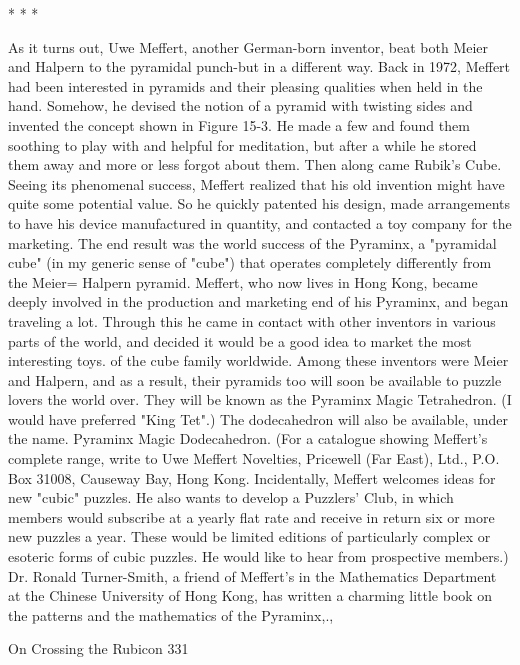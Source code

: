                                        *   *   *

        As it turns out, Uwe Meffert, another German-born inventor, beat both Meier
and Halpern to the pyramidal punch-but in a different way. Back in 1972, Meffert had
been interested in pyramids and their pleasing qualities when held in the hand.
Somehow, he devised the notion of a pyramid with twisting sides and invented the
concept shown in Figure 15-3. He made a few and found them soothing to play with
and helpful for meditation, but after a while he stored them away and more or less
forgot about them. Then along came Rubik's Cube. Seeing its phenomenal success,
Meffert realized that his old invention might have quite some potential value. So he
quickly patented his design, made arrangements to have his device manufactured in
quantity, and contacted a toy company for the marketing. The end result was the
world success of the Pyraminx, a "pyramidal cube" (in my generic sense of "cube")
that operates completely differently from the Meier= Halpern pyramid.
        Meffert, who now lives in Hong Kong, became deeply involved in the
production and marketing end of his Pyraminx, and began traveling a lot. Through
this he came in contact with other inventors in various parts of the world, and decided
it would be a good idea to market the most interesting toys. of the cube family
worldwide. Among these inventors were Meier and Halpern, and as a result, their
pyramids too will soon be available to puzzle lovers the world over. They will be
known as the Pyraminx Magic Tetrahedron. (I would have preferred "King Tet".) The
dodecahedron will also be available, under the name. Pyraminx Magic Dodecahedron.
(For a catalogue showing Meffert's complete range, write to Uwe Meffert Novelties,
Pricewell (Far East), Ltd., P.O. Box 31008, Causeway Bay, Hong Kong. Incidentally,
Meffert welcomes ideas for new "cubic" puzzles. He also wants to develop a Puzzlers'
Club, in which members would subscribe at a yearly flat rate and receive in return six
or more new puzzles a year. These would be limited editions of particularly complex
or esoteric forms of cubic puzzles. He would like to hear from prospective members.)
        Dr. Ronald Turner-Smith, a friend of Meffert's in the Mathematics Department
at the Chinese University of Hong Kong, has written a charming little book on the
patterns and the mathematics of the Pyraminx,.,




On Crossing the Rubicon                                                            331


